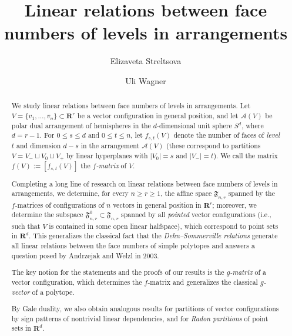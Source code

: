 \documentclass[a4paper,USenglish,cleveref, autoref, thm-restate,nolineno]{socg-lipics-v2021}
\title{Linear relations between face numbers of 
levels in arrangements}
\author{Elizaveta Streltsova}{ISTA, Klosterneuburg, Austria}{estrelts@ist.ac.at
}{}{}%
\author{Uli Wagner}{ISTA, Klosterneuburg, Austria \and \url{https://ist.ac.at/en/research/wagner-group/}}{uli@ist.ac.at}{https://orcid.org/0000-0002-1494-0568}{}
\newcommand{\fspace}{\mathfrak{F}}
\renewcommand{\leq}{\leqslant}
\renewcommand{\geq}{\geqslant}
\newcommand{\R}{\mathbf{R}}
\begin{document}
\maketitle
\thispagestyle{empty}

\begin{abstract}
We study linear relations between face numbers of levels in arrangements. Let $V = \{ v_1, \ldots, v_n \} \subset \mathbf{R}^{r}$ be a vector configuration in general position, and let $\mathcal{A}(V)$ be polar dual arrangement of hemispheres in the $d$-dimensional unit sphere $S^d$, where $d=r-1$. For $0\leq s \leq d$ and $0 \leq t \leq n$, 
let $f_{s,t}(V)$ denote the number of faces of \emph{level} $t$ and dimension $d-s$ in the arrangement $\mathcal{A}(V)$ (these correspond to partitions $V=V_-\sqcup V_0 \sqcup V_+$ by linear hyperplanes with $|V_0|=s$ and $|V_-|=t$).
We call the matrix $f(V):=[f_{s,t}(V)]$ the \emph{$f$-matrix} of $V$. 

Completing a long line of research on linear relations between face numbers of levels in arrangements, we determine, for every $n\geq r \geq 1$, the affine space $\fspace_{n,r}$ spanned by the $f$-matrices of configurations of $n$ vectors in general position in $\R^r$; moreover, we determine the subspace $\fspace^0_{n,r} \subset \fspace_{n,r}$ spanned by all \emph{pointed} vector configurations (i.e., such that $V$ is contained in some open linear halfspace), which correspond to point sets in $\R^d$. This generalizes the classical fact that the \emph{Dehn--Sommerville relations} generate all linear relations between the face numbers of simple polytopes %
and answers a question posed by Andrzejak and Welzl in 2003.

The key notion for the statements and the proofs of our results is the \emph{$g$-matrix} of a vector configuration, which determines the $f$-matrix and generalizes the classical \emph{$g$-vector} of a polytope.

By Gale duality, we also obtain analogous results for partitions of vector configurations by sign patterns of nontrivial linear dependencies, and for \emph{Radon partitions} of point sets in $\mathbf{R}^d$.
\end{abstract}
\end{document}
